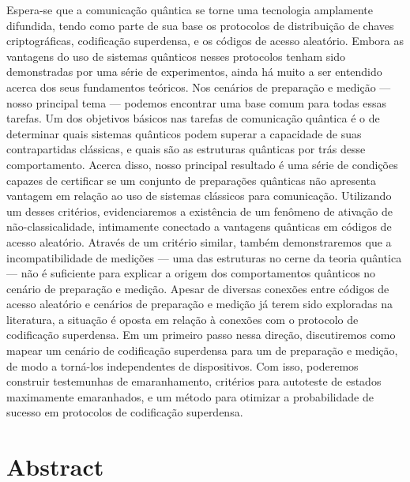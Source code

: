 Espera-se que a comunicação quântica se torne uma tecnologia amplamente difundida, tendo como parte de sua base os protocolos de distribuição de chaves criptográficas, codificação superdensa, e os códigos de acesso aleatório. Embora as vantagens do uso de sistemas quânticos nesses protocolos tenham sido demonstradas por uma série de experimentos, ainda há muito a ser entendido acerca dos seus fundamentos teóricos. Nos cenários de preparação e medição — nosso principal tema — podemos encontrar uma base comum para todas essas tarefas. Um dos objetivos básicos nas tarefas de comunicação quântica é o de determinar quais sistemas quânticos podem superar a capacidade de suas contrapartidas clássicas, e quais são as estruturas quânticas por trás desse comportamento. Acerca disso, nosso principal resultado é uma série de condições capazes de certificar se um conjunto de preparações quânticas não apresenta vantagem em relação ao uso de sistemas clássicos para comunicação. Utilizando um desses critérios, evidenciaremos a existência de um fenômeno de ativação de não-classicalidade, intimamente conectado a vantagens quânticas em códigos de acesso aleatório. Através de um critério similar, também demonstraremos que a incompatibilidade de medições — uma das estruturas no cerne da teoria quântica — não é suficiente para explicar a origem dos comportamentos quânticos no cenário de preparação e medição. Apesar de diversas conexões entre códigos de acesso aleatório e cenários de preparação e medição já terem sido exploradas na literatura, a situação é oposta em relação à conexões com o protocolo de codificação superdensa. Em um primeiro passo nessa direção, discutiremos como mapear um cenário de codificação superdensa para um de preparação e medição, de modo a torná-los independentes de dispositivos. Com isso, poderemos construir testemunhas de emaranhamento, critérios para autoteste de estados maximamente emaranhados, e um método para otimizar a probabilidade de sucesso em protocolos de codificação superdensa.




\newpage
\chapter*{Abstract}
\thispagestyle{empty}

